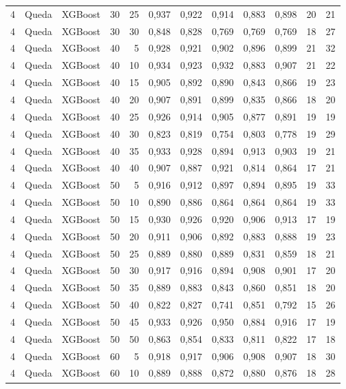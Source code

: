 \begin{longtable}{@{}rllrrrrrrrrr@{}}
4 & Queda & XGBoost & 30 & 25 & 0,937 & 0,922 & 0,914 & 0,883 & 0,898 & 20 & 21 \\
4 & Queda & XGBoost & 30 & 30 & 0,848 & 0,828 & 0,769 & 0,769 & 0,769 & 18 & 27 \\
4 & Queda & XGBoost & 40 & 5 & 0,928 & 0,921 & 0,902 & 0,896 & 0,899 & 21 & 32 \\
4 & Queda & XGBoost & 40 & 10 & 0,934 & 0,923 & 0,932 & 0,883 & 0,907 & 21 & 22 \\
4 & Queda & XGBoost & 40 & 15 & 0,905 & 0,892 & 0,890 & 0,843 & 0,866 & 19 & 23 \\
4 & Queda & XGBoost & 40 & 20 & 0,907 & 0,891 & 0,899 & 0,835 & 0,866 & 18 & 20 \\
4 & Queda & XGBoost & 40 & 25 & 0,926 & 0,914 & 0,905 & 0,877 & 0,891 & 19 & 19 \\
4 & Queda & XGBoost & 40 & 30 & 0,823 & 0,819 & 0,754 & 0,803 & 0,778 & 19 & 29 \\
4 & Queda & XGBoost & 40 & 35 & 0,933 & 0,928 & 0,894 & 0,913 & 0,903 & 19 & 21 \\
4 & Queda & XGBoost & 40 & 40 & 0,907 & 0,887 & 0,921 & 0,814 & 0,864 & 17 & 21 \\
4 & Queda & XGBoost & 50 & 5 & 0,916 & 0,912 & 0,897 & 0,894 & 0,895 & 19 & 33 \\
4 & Queda & XGBoost & 50 & 10 & 0,890 & 0,886 & 0,864 & 0,864 & 0,864 & 19 & 33 \\
4 & Queda & XGBoost & 50 & 15 & 0,930 & 0,926 & 0,920 & 0,906 & 0,913 & 17 & 19 \\
4 & Queda & XGBoost & 50 & 20 & 0,911 & 0,906 & 0,892 & 0,883 & 0,888 & 19 & 23 \\
4 & Queda & XGBoost & 50 & 25 & 0,889 & 0,880 & 0,889 & 0,831 & 0,859 & 18 & 21 \\
4 & Queda & XGBoost & 50 & 30 & 0,917 & 0,916 & 0,894 & 0,908 & 0,901 & 17 & 20 \\
4 & Queda & XGBoost & 50 & 35 & 0,889 & 0,883 & 0,843 & 0,860 & 0,851 & 18 & 20 \\
4 & Queda & XGBoost & 50 & 40 & 0,822 & 0,827 & 0,741 & 0,851 & 0,792 & 15 & 26 \\
4 & Queda & XGBoost & 50 & 45 & 0,933 & 0,926 & 0,950 & 0,884 & 0,916 & 17 & 19 \\
4 & Queda & XGBoost & 50 & 50 & 0,863 & 0,854 & 0,833 & 0,811 & 0,822 & 17 & 18 \\
4 & Queda & XGBoost & 60 & 5 & 0,918 & 0,917 & 0,906 & 0,908 & 0,907 & 18 & 30 \\
4 & Queda & XGBoost & 60 & 10 & 0,889 & 0,888 & 0,872 & 0,880 & 0,876 & 18 & 28 \\

\end{longtable}
